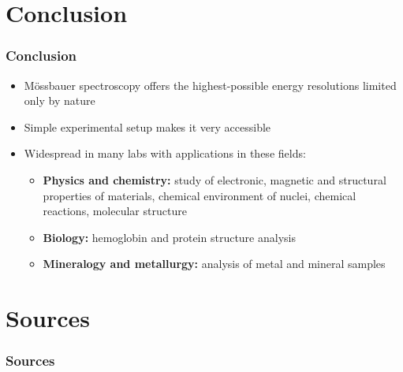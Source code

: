 \section{Conclusion}
	\frame[plain]{\tableofcontents[currentsection]}
	
	\begin{frame}
	\frametitle{Conclusion}
	
		\begin{itemize}
			\item Mössbauer spectroscopy offers the highest-possible energy resolutions limited only by nature
			\item Simple experimental setup makes it very accessible
			\item Widespread in many labs with applications in these fields:
			\begin{itemize}
				\item \textbf{Physics and chemistry:} study of electronic, magnetic and structural properties of materials, chemical environment of nuclei, chemical reactions, molecular structure
				\item \textbf{Biology:} hemoglobin and protein structure analysis
				\item \textbf{Mineralogy and metallurgy:} analysis of metal and mineral samples
			\end{itemize}
		\end{itemize}
	\end{frame}

\section{Sources}
	\frame[plain]{\tableofcontents[currentsection]}
	\begin{frame}[allowframebreaks]
		\frametitle{Sources}
		
		{\footnotesize}
	\end{frame}
